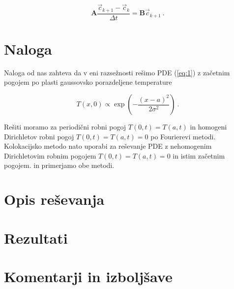 \documentclass[a4paper]{article}
\begin{document}
\begin{equation}
    \mathbf{A}\frac{\vec{c}_{k+1}-\vec{c}_k}{\Delta t} = \mathbf{B}\vec{c}_{k+1}\>.
\end{equation}

\section{Naloga}
Naloga od nas zahteva da v eni razsežnosti rešimo PDE (\ref{eq:1}) z začetnim pogojem
po plasti gaussovsko porazdeljene temperature

\begin{equation}
    T(x, 0) \propto \exp{\left(-\frac{(x-a)^2}{2\sigma^2}\right)}\>.
\end{equation}

Rešiti moramo za periodični robni pogoj $T(0, t) = T(a, t)$ in homogeni Dirichletov robni pogoj
$T(0, t) = T(a, t) = 0$ po Fourierevi metodi. Kolokacijsko metodo nato uporabi za reševanje
PDE z nehomogenim Dirichletovim robnim pogojem $T(0, t) = T(a, t) = 0$ in istim začetnim pogojem.
in primerjamo obe metodi.\\

\section{Opis reševanja}

\section{Rezultati}


\section{Komentarji in izboljšave}

\newpage


\end{document}
